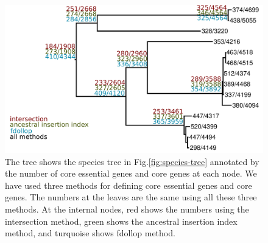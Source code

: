 \documentclass[12pt,letterpaper]{article}
\begin{document}
\begin{figure}
\centering
\includegraphics[scale=0.2]{phylosift-aa-raxmlbootstrap-annotated.pdf}
\caption{The tree shows the species tree in Fig.\@\ref{fig:species-tree} annotated by the number of core essential genes and core genes at each node. We have used three methods for defining core essential genes and core genes. The numbers at the leaves are the same using all these three methods. At the internal nodes, red shows the numbers using the intersection method, green shows the ancestral insertion index method, and turquoise shows fdollop method.}
\label{fig:annotated-speciestree}
\end{figure}

%
%




\end{document}
